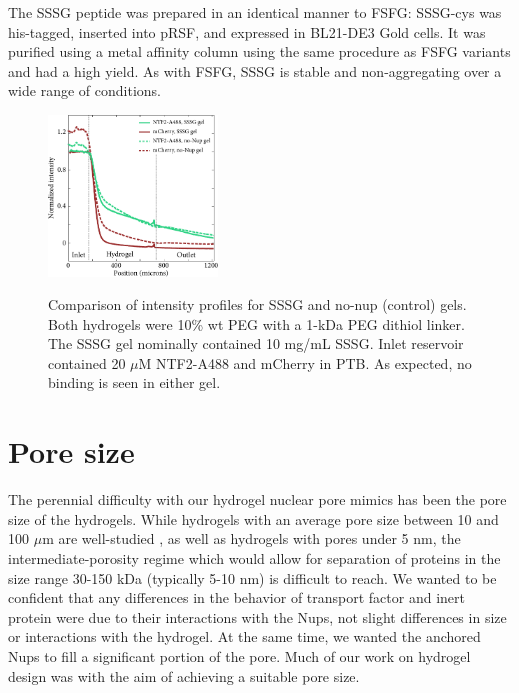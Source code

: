 The SSSG peptide was prepared in an identical manner to FSFG: SSSG-cys was his-tagged, inserted into pRSF, and expressed in BL21-DE3 Gold cells.  It was purified using a metal  affinity column using the same procedure as FSFG variants and had a high yield.  As with FSFG, SSSG is stable and non-aggregating over a wide range of conditions.
\begin{figure} %
\caption{Comparison of intensity profiles for SSSG and no-nup (control) gels. Both hydrogels were 10\% wt PEG with a 1-kDa PEG dithiol linker.  The SSSG gel nominally contained 10 mg/mL SSSG.  Inlet reservoir contained 20 $\mu$M NTF2-A488 and mCherry in PTB.  As expected, no binding is seen in either gel.\\}
\centering
\includegraphics[width=0.4\textwidth]{figs/ch03/SSSG-control-comparison}
\label{fig:SSSG-control-comparison}
\end{figure} 

\section{Pore size}

The perennial difficulty with our hydrogel nuclear pore mimics has been the pore size of the hydrogels. While hydrogels with an average pore size between 10 and 100 $\mu$m are well-studied \cite{annabi10}, as well as hydrogels with pores under 5 nm, the intermediate-porosity regime which would allow for separation of proteins in the size range 30-150 kDa (typically 5-10 nm) is difficult to reach.  We wanted to be confident that any differences in the behavior of transport factor and inert protein were due to their interactions with the Nups, not slight differences in size or interactions with the hydrogel.  At the same time, we wanted the anchored Nups to fill a significant portion of the pore.  Much of our work on hydrogel design was with the aim of achieving a suitable pore size.

